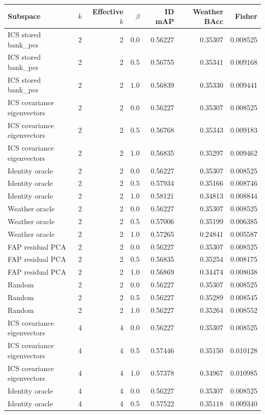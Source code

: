 \begin{tabular}{lrrrrrr}
\toprule
Subspace & $k$ & Effective $k$ & $\beta$ & ID mAP & Weather BAcc & Fisher \\
\midrule
ICS stored bank_pcs & 2 & 2 & 0.0 & 0.56227 & 0.35307 & 0.008525 \\
ICS stored bank_pcs & 2 & 2 & 0.5 & 0.56755 & 0.35341 & 0.009168 \\
ICS stored bank_pcs & 2 & 2 & 1.0 & 0.56839 & 0.35330 & 0.009441 \\
ICS covariance eigenvectors & 2 & 2 & 0.0 & 0.56227 & 0.35307 & 0.008525 \\
ICS covariance eigenvectors & 2 & 2 & 0.5 & 0.56768 & 0.35343 & 0.009183 \\
ICS covariance eigenvectors & 2 & 2 & 1.0 & 0.56835 & 0.35297 & 0.009462 \\
Identity oracle & 2 & 2 & 0.0 & 0.56227 & 0.35307 & 0.008525 \\
Identity oracle & 2 & 2 & 0.5 & 0.57934 & 0.35166 & 0.008746 \\
Identity oracle & 2 & 2 & 1.0 & 0.58121 & 0.34813 & 0.008844 \\
Weather oracle & 2 & 2 & 0.0 & 0.56227 & 0.35307 & 0.008525 \\
Weather oracle & 2 & 2 & 0.5 & 0.57006 & 0.35199 & 0.006385 \\
Weather oracle & 2 & 2 & 1.0 & 0.57265 & 0.24841 & 0.005587 \\
FAP residual PCA & 2 & 2 & 0.0 & 0.56227 & 0.35307 & 0.008525 \\
FAP residual PCA & 2 & 2 & 0.5 & 0.56835 & 0.35254 & 0.008175 \\
FAP residual PCA & 2 & 2 & 1.0 & 0.56869 & 0.34474 & 0.008038 \\
Random & 2 & 2 & 0.0 & 0.56227 & 0.35307 & 0.008525 \\
Random & 2 & 2 & 0.5 & 0.56227 & 0.35289 & 0.008545 \\
Random & 2 & 2 & 1.0 & 0.56227 & 0.35264 & 0.008552 \\
ICS covariance eigenvectors & 4 & 4 & 0.0 & 0.56227 & 0.35307 & 0.008525 \\
ICS covariance eigenvectors & 4 & 4 & 0.5 & 0.57446 & 0.35150 & 0.010128 \\
ICS covariance eigenvectors & 4 & 4 & 1.0 & 0.57378 & 0.34967 & 0.010985 \\
Identity oracle & 4 & 4 & 0.0 & 0.56227 & 0.35307 & 0.008525 \\
Identity oracle & 4 & 4 & 0.5 & 0.57522 & 0.35118 & 0.009340 \\

\end{tabular}
